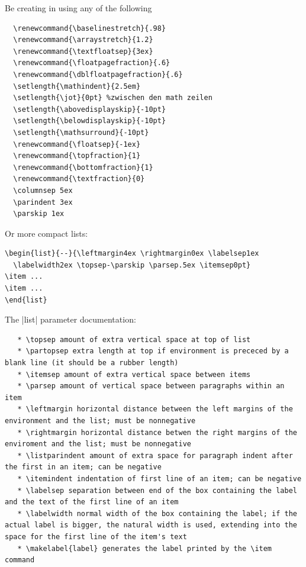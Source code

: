 Be creating in using any of the following\\
\begin{code}
\begin{verbatim}
  \renewcommand{\baselinestretch}{.98}
  \renewcommand{\arraystretch}{1.2}
  \renewcommand{\textfloatsep}{3ex}
  \renewcommand{\floatpagefraction}{.6}
  \renewcommand{\dblfloatpagefraction}{.6}
  \setlength{\mathindent}{2.5em}
  \setlength{\jot}{0pt} %zwischen den math zeilen
  \setlength{\abovedisplayskip}{-10pt}
  \setlength{\belowdisplayskip}{-10pt}
  \setlength{\mathsurround}{-10pt}
  \renewcommand{\floatsep}{-1ex}
  \renewcommand{\topfraction}{1}
  \renewcommand{\bottomfraction}{1}
  \renewcommand{\textfraction}{0}
  \columnsep 5ex
  \parindent 3ex
  \parskip 1ex
\end{verbatim}
\end{code}

Or more compact lists:\\
\begin{code}
\begin{verbatim}
\begin{list}{--}{\leftmargin4ex \rightmargin0ex \labelsep1ex
  \labelwidth2ex \topsep-\parskip \parsep.5ex \itemsep0pt}
\item ...
\item ...
\end{list}
\end{verbatim}
\end{code}

The |list| parameter documentation:\\
\begin{code}
\begin{verbatim}
   * \topsep amount of extra vertical space at top of list
   * \partopsep extra length at top if environment is prececed by a blank line (it should be a rubber length)
   * \itemsep amount of extra vertical space between items
   * \parsep amount of vertical space between paragraphs within an item
   * \leftmargin horizontal distance between the left margins of the environment and the list; must be nonnegative
   * \rightmargin horizontal distance betwen the right margins of the enviroment and the list; must be nonnegative
   * \listparindent amount of extra space for paragraph indent after the first in an item; can be negative
   * \itemindent indentation of first line of an item; can be negative
   * \labelsep separation between end of the box containing the label and the text of the first line of an item
   * \labelwidth normal width of the box containing the label; if the actual label is bigger, the natural width is used, extending into the space for the first line of the item's text
   * \makelabel{label} generates the label printed by the \item command
\end{verbatim}
\end{code}


